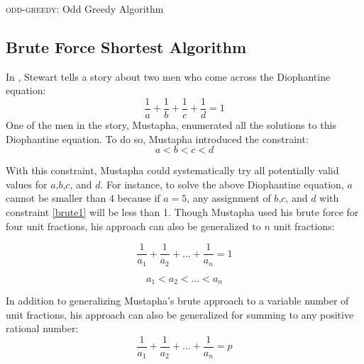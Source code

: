 \documentclass[paper=a4, fontsize=11pt]{scrartcl}
\numberwithin{equation}{section}	 %
\numberwithin{figure}{section}	 %
\numberwithin{table}{section}	 %
\begin{document}
\begin{algorithm}[t]
\caption{\textsc{odd-greedy}: Odd Greedy Algorithm}
\label{alg:two}
\end{algorithm}

\subsection{Brute Force Shortest Algorithm}
In \cite{stewart}, Stewart tells a story about two men who come across the Diophantine equation:
\begin{equation}
	\frac{1}{a} + \frac{1}{b} + \frac{1}{c} + \frac{1}{d} = 1
\end{equation}
One of the men in the story, Mustapha, enumerated all the solutions to this Diophantine equation. To do so, Mustapha introduced the constraint:
\begin{equation}\label{brute1}
	a < b < c < d
\end{equation}

With this constraint, Mustapha could systematically try all potentially valid values for $a$,$b$,$c$, and $d$. For instance, to solve the above Diophantine equation, $a$ cannot be smaller than 4 because if $a=5$, any assignment of $b$,$c$, and $d$ with constraint \ref{brute1} will be less than 1. Though Mustapha used his brute force for four unit fractions, his approach can also be generalized to $n$ unit fractions:

\begin{equation}
	\frac{1}{a_1} + \frac{1}{a_2} + \ldots + \frac{1}{a_n} = 1
\end{equation}

\begin{equation}\label{brute2}
	a_1 < a_2 < \ldots < a_n
\end{equation}

In addition to generalizing Mustapha’s brute approach to a variable number of unit fractions, his approach can also be generalized for summing to any positive rational number:
\begin{equation}\label{brute_p}
	\frac{1}{a_1} + \frac{1}{a_2} + \ldots + \frac{1}{a_n} = p
\end{equation}
\end{document}
